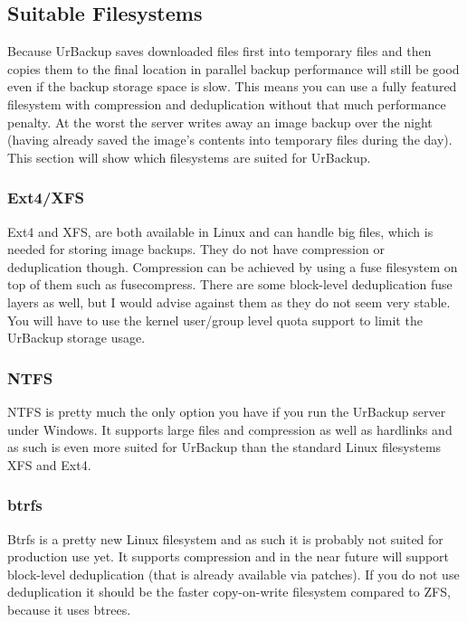 \documentclass[a4paper,10pt]{article}
\begin{document}
\subsection{Suitable Filesystems}
\label{subsec_filesystems}

Because UrBackup saves downloaded files first into temporary files and then copies them to the final location in parallel backup performance will still be good even if the backup storage space is slow. This means you can use a fully featured filesystem with compression and deduplication without that much performance penalty. At the worst the server writes away an image backup over the night (having already saved the image's contents into temporary files during the day). This section will show which filesystems are suited for UrBackup.

\subsubsection{Ext4/XFS}

Ext4 and XFS, are both available in Linux and can handle big files, which is needed for storing image backups. They do not have compression or deduplication though. Compression can be achieved by using a fuse filesystem on top of them such as fusecompress. There are some block-level deduplication fuse layers as well, but I would advise against them as they do not seem very stable. You will have to use the kernel user/group level quota support to limit the UrBackup storage usage.

\subsubsection{NTFS}

NTFS is pretty much the only option you have if you run the UrBackup server under Windows. It supports large files and compression as well as hardlinks and as such is even more suited for UrBackup than the standard Linux filesystems XFS and Ext4. 

\subsubsection{btrfs}

Btrfs is a pretty new Linux filesystem and as such it is probably not suited for production use yet. It supports compression and in the near future will support block-level deduplication (that is already available via patches). If you do not use deduplication it should be the faster copy-on-write filesystem compared to ZFS, because it uses btrees.
\end{document}
